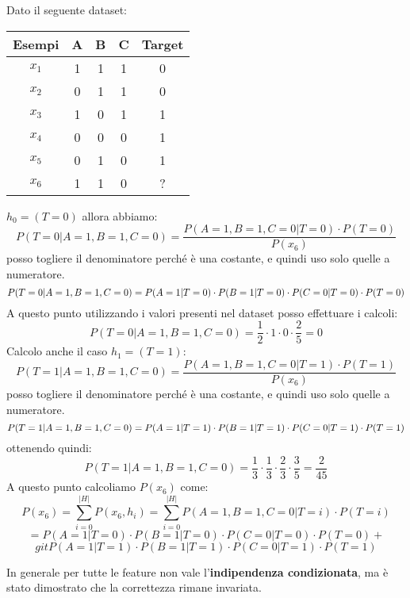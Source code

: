 \begin{esempio}
    Dato il seguente dataset:
    \begin{table}[!ht]
        \centering
        \begin{tabular}{c|ccc|c}
            Esempi & A & B & C & Target \\ \hline
            $x_1$  & 1 & 1 & 1 & 0      \\ \hline
            $x_2$  & 0 & 1 & 1 & 0      \\ \hline
            $x_3$  & 1 & 0 & 1 & 1      \\ \hline
            $x_4$  & 0 & 0 & 0 & 1      \\ \hline
            $x_5$  & 0 & 1 & 0 & 1      \\ \hline
            $x_6$  & 1 & 1 & 0 & ?      \\
        \end{tabular}
    \end{table}
    $h_0 = (T = 0)$ allora abbiamo:
    $$P(T = 0 | A = 1, B = 1, C = 0) = \frac{P(A = 1, B = 1, C = 0 | T = 0) \cdot P(T = 0)}{P(x_6)}$$
    posso togliere il denominatore perché è una costante, e quindi uso solo quelle a numeratore.
    $$P(T = 0 | A = 1, B = 1, C = 0) = \\ P(A = 1 | T = 0) \cdot P(B = 1 | T = 0) \cdot P(C = 0 | T = 0) \cdot P(T = 0)$$
    A questo punto utilizzando i valori presenti nel dataset posso effettuare i calcoli:
    $$P(T = 0 | A = 1, B = 1, C = 0) = \frac{1}{2} \cdot 1 \cdot 0 \cdot \frac{2}{5} = 0$$
    Calcolo anche il caso $h_1 = (T = 1)$: $$P(T = 1 | A = 1, B = 1, C = 0) = \frac{P(A = 1, B = 1, C = 0 | T = 1) \cdot P(T = 1)}{P(x_6)}$$
    posso togliere il denominatore perché è una costante, e quindi uso solo
    quelle a numeratore. $$P(T = 1 | A = 1, B = 1, C = 0) = \\ P(A = 1 | T = 1) \cdot P(B = 1 | T = 1) \cdot P(C = 0 | T = 1) \cdot P(T = 1)$$
    ottenendo quindi: $$P(T = 1 | A = 1, B = 1, C = 0) = \frac{1}{3} \cdot \frac{1}{3} \cdot \frac{2}{3} \cdot \frac{3}{5} = \frac{2}{45}$$
    A questo punto calcoliamo $P(x_6)$ come: $$P(x_6) = \sum_{i = 0}^{|H|} P(x_6, h_i) = \sum_{i = 0}^{|H|} P(A =  1, B = 1, C = 0 | T = i) \cdot P(T = i)$$
    $$= P(A = 1 | T = 0) \cdot P(B = 1 | T = 0) \cdot P(C = 0 | T = 0) \cdot P(T = 0) + $$ $$gitP(A = 1 | T = 1) \cdot P(B = 1 | T = 1) \cdot P(C = 0 | T = 1) \cdot P(T = 1)$$
\end{esempio}
In generale per tutte le feature non vale l'\textbf{indipendenza condizionata}, ma
è stato dimostrato che la correttezza rimane invariata.

